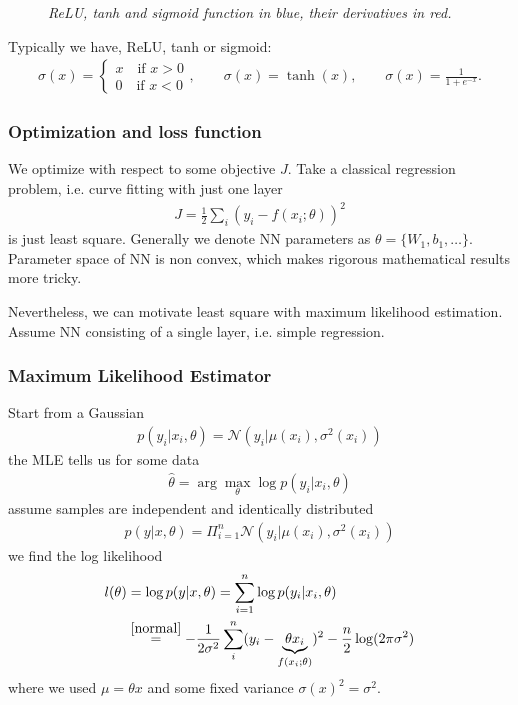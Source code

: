 \documentclass{beamer}
\begin{document}
\begin{frame}
\begin{figure}[t]
\begin{minipage}{0.3\linewidth}
	\end{minipage}
	\caption{\it ReLU, tanh and sigmoid function in blue, their derivatives in red.}
	\label{fig:act}
\end{figure}

Typically we have, ReLU, tanh or sigmoid:
\begin{align}
	\sigma(x) = \begin{cases}
	x \quad \text{if } x>0\\
	0 \quad \text{if } x<0
	\end{cases},
	\qquad \sigma (x) = \tanh (x), \qquad \sigma (x) = \frac{1}{1 + e^{-x}}.
\end{align}
\end{frame}

\begin{frame}
\frametitle{Optimization and loss function}
We optimize with respect to some objective $J$. Take a classical regression problem, i.e. curve fitting with just one layer
\begin{align}
	J = \frac{1}{2} \sum_i (y_i - f(x_i; \theta))^2
\end{align}
is just least square. Generally we denote NN parameters as $\theta = \{ W_1, b_1, \dots \}$.\\
\vspace{0.5cm}
\pause 
Parameter space of NN is non convex, which makes rigorous mathematical results more tricky.

Nevertheless, we can motivate least square with maximum likelihood estimation. Assume NN consisting of a single layer, i.e. simple regression.
\end{frame}

\begin{frame}
\frametitle{Maximum Likelihood Estimator}
Start from a Gaussian
\begin{align}
\label{normal}
p(y_i|x_i,\theta) = \mathcal{N}(y_i|\mu(x_i), \sigma^2(x_i)) %
\end{align}
the MLE tells us for some data 
\begin{align}
	\hat{\theta} = \arg \underset{\theta}{\max} \log p(y_i|x_i,\theta)
\end{align}
assume samples are independent and identically distributed
\begin{align}
	p(y|x,\theta) = \Pi_{i=1}^n \mathcal{N}(y_i|\mu(x_i), \sigma^2(x_i))
\end{align}
\pause
we find the log likelihood
\begin{align}
	l(\theta) &= \log p(y|x,\theta) = \sum_{i=1}^{n} \log p(y_i|x_i, \theta) \nonumber \\
	& \stackrel{\ref{normal}}{=} -\frac{1}{2 \sigma^2} \sum_i^n (y_i -  \underbrace{\theta x_i}_{f(x_i; \theta)})^2 - \frac{n}{2} \log (2 \pi \sigma^2)
\end{align}
where we used $\mu = \theta x$ and some fixed variance $\sigma(x)^2 = \sigma^2$.
\end{frame}
\end{document}
